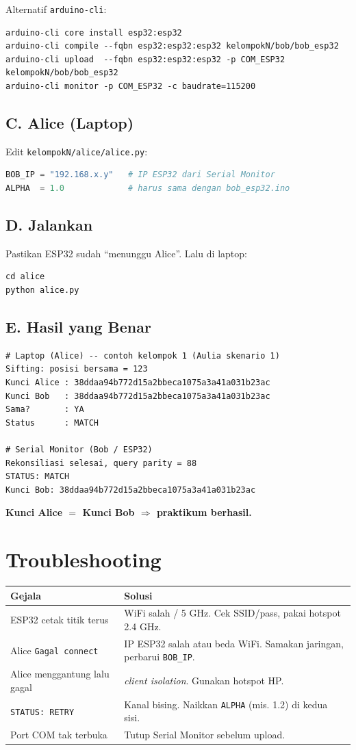 \documentclass[11pt,a4paper]{article}
\begin{document}
\noindent Alternatif \texttt{arduino-cli}:
\begin{lstlisting}
arduino-cli core install esp32:esp32
arduino-cli compile --fqbn esp32:esp32:esp32 kelompokN/bob/bob_esp32
arduino-cli upload  --fqbn esp32:esp32:esp32 -p COM_ESP32 kelompokN/bob/bob_esp32
arduino-cli monitor -p COM_ESP32 -c baudrate=115200
\end{lstlisting}

\subsection{C. Alice (Laptop)}
Edit \texttt{kelompokN/alice/alice.py}:
\begin{lstlisting}[language=Python]
BOB_IP = "192.168.x.y"   # IP ESP32 dari Serial Monitor
ALPHA  = 1.0             # harus sama dengan bob_esp32.ino
\end{lstlisting}

\subsection{D. Jalankan}
Pastikan ESP32 sudah ``menunggu Alice''. Lalu di laptop:
\begin{lstlisting}
cd alice
python alice.py
\end{lstlisting}

\subsection{E. Hasil yang Benar}
\begin{lstlisting}
# Laptop (Alice) -- contoh kelompok 1 (Aulia skenario 1)
Sifting: posisi bersama = 123
Kunci Alice : 38ddaa94b772d15a2bbeca1075a3a41a031b23ac
Kunci Bob   : 38ddaa94b772d15a2bbeca1075a3a41a031b23ac
Sama?       : YA
Status      : MATCH

# Serial Monitor (Bob / ESP32)
Rekonsiliasi selesai, query parity = 88
STATUS: MATCH
Kunci Bob: 38ddaa94b772d15a2bbeca1075a3a41a031b23ac
\end{lstlisting}
\textbf{Kunci Alice $=$ Kunci Bob $\Rightarrow$ praktikum berhasil.}

\section{Troubleshooting}
\begin{longtable}{p{4.8cm} p{8.6cm}}
\toprule
\textbf{Gejala} & \textbf{Solusi} \\
\midrule
ESP32 cetak titik terus & WiFi salah / 5 GHz. Cek SSID/pass, pakai hotspot 2.4 GHz. \\
Alice \texttt{Gagal connect} & IP ESP32 salah atau beda WiFi. Samakan jaringan, perbarui \texttt{BOB\_IP}. \\
Alice menggantung lalu gagal & \emph{client isolation}. Gunakan hotspot HP. \\
\texttt{STATUS: RETRY} & Kanal bising. Naikkan \texttt{ALPHA} (mis. 1.2) di kedua sisi. \\
Port COM tak terbuka & Tutup Serial Monitor sebelum upload. \\
\bottomrule
\end{longtable}
\end{document}
